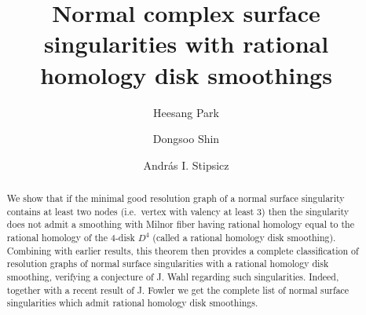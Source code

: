 \documentclass[a4paper, reqno, twoside]{amsart}
\theoremstyle{definition}
\numberwithin{equation}{section}
\begin{document}
\title[Singularities with rational homology disk smoothings]{Normal complex surface singularities with rational homology disk smoothings}

\author[H. Park]{Heesang Park}

\address{Department of Mathematics, Konkuk University, Seoul 143-701, Korea}


\author[D. Shin]{Dongsoo Shin}

\address{Department of Mathematics, Chungnam National University,
  Daejeon 305-764, Korea}


\author[A. I. Stipsicz]{Andr\'{a}s I. Stipsicz}

\address{R\'enyi Institute of Mathematics, Re\'altanoda utca 13-15.,
Budapest 1053, Hungary}




\begin{abstract}
We show that if the minimal good resolution graph of a normal surface
singularity contains at least two nodes (i.e.\  vertex with valency at
least 3) then the singularity does not admit a smoothing with Milnor
fiber having rational homology equal to the rational homology of the
4-disk $D^4$ (called a rational homology disk smoothing).  Combining
with earlier results, this theorem then provides a complete
classification of resolution graphs of normal surface singularities
with a rational homology disk smoothing, verifying a conjecture of
J. Wahl regarding such singularities.  Indeed, together with a recent
result of J. Fowler we get the complete list of normal surface
singularities which admit rational homology disk smoothings.
\end{abstract}

\maketitle
\end{document}
